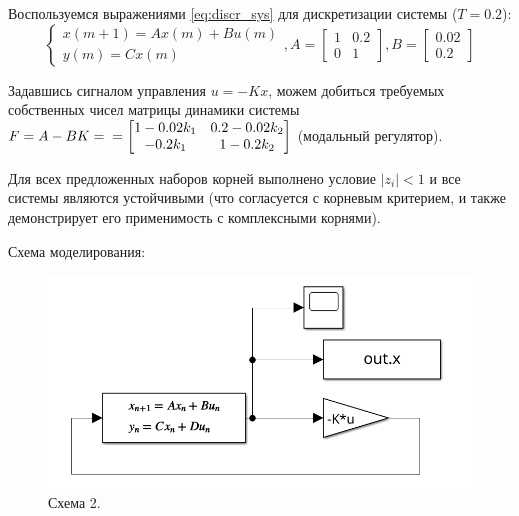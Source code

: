 \documentclass[a4paper, 14pt]{extarticle}
\theoremstyle{definition}
\theoremstyle{plain}
\theoremstyle{remark}
\begin{document}
Воспользуемся выражениями \ref{eq:discr_sys} для дискретизации системы ($T=0.2$):
\begin{equation}
	\begin{cases}
		x(m+1) = Ax(m) + Bu(m)\\
		y(m) = Cx(m)
	\end{cases}, A = \begin{bmatrix}
		1 & 0.2 \\
		0 & 1
	\end{bmatrix}, B = \begin{bmatrix}
		0.02 \\ 0.2
	\end{bmatrix}
\end{equation}

Задавшись сигналом управления $u = -Kx$, можем добиться требуемых собственных чисел матрицы динамики системы $F = A-BK= \\=\begin{bmatrix}
	1 - 0.02k_1 & 0.2 - 0.02k_2 \\ -0.2k_1 & 1 -0.2k_2
\end{bmatrix}$ (модальный регулятор).

Для всех предложенных наборов корней выполнено условие $|z_i| < 1$ и все системы являются устойчивыми (что согласуется с корневым критерием, и также демонстрирует его применимость с комплексными корнями). 

Схема моделирования:
\begin{figure}
    [H]
    \centering
    \includegraphics[width=350pt]{images/scheme_2.png}
    \caption{Схема 2.}
\end{figure}
\end{document}
